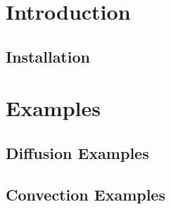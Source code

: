\documentclass[letterpaper]{book}
\begin{document}
\mainmatter

\part{Introduction}

\parttoc



\chapter{Installation}








\part{Examples}

\parttoc

\chapter{Diffusion Examples}


\newpage

\newpage

\newpage

\newpage

\newpage

\newpage

\newpage

\newpage

\newpage

\newpage

\newpage

\chapter{Convection Examples}
\end{document}
